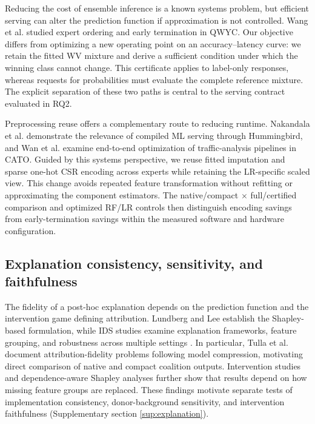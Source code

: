\documentclass[final,3p,10pt,nopreprintline]{elsarticle}
\begin{document}
Reducing the cost of ensemble inference is a known systems problem, but efficient serving can alter the prediction function if approximation is not controlled. Wang et al. \cite{r6} studied expert ordering and early termination in QWYC. Our objective differs from optimizing a new operating point on an accuracy--latency curve: we retain the fitted WV mixture and derive a sufficient condition under which the winning class cannot change. This certificate applies to label-only responses, whereas requests for probabilities must evaluate the complete reference mixture. The explicit separation of these two paths is central to the serving contract evaluated in RQ2.

Preprocessing reuse offers a complementary route to reducing runtime. Nakandala et al. \cite{r7} demonstrate the relevance of compiled ML serving through Hummingbird, and Wan et al. \cite{r8} examine end-to-end optimization of traffic-analysis pipelines in CATO. Guided by this systems perspective, we reuse fitted imputation and sparse one-hot CSR encoding across experts while retaining the LR-specific scaled view. This change avoids repeated feature transformation without refitting or approximating the component estimators. The native/compact \(\times\) full/certified comparison and optimized RF/LR controls then distinguish encoding savings from early-termination savings within the measured software and hardware configuration.

\subsection{Explanation consistency, sensitivity, and faithfulness}

The fidelity of a post-hoc explanation depends on the prediction function and the intervention game defining attribution. Lundberg and Lee \cite{r9} establish the Shapley-based formulation, while IDS studies examine explanation frameworks, feature grouping, and robustness across multiple settings \cite{r10,r11,r12,r21,r22,r23,r24}. In particular, Tulla et al. \cite{r25} document attribution-fidelity problems following model compression, motivating direct comparison of native and compact coalition outputs. Intervention studies \cite{r13} and dependence-aware Shapley analyses \cite{r14,r15} further show that results depend on how missing feature groups are replaced. These findings motivate separate tests of implementation consistency, donor-background sensitivity, and intervention faithfulness (Supplementary section \ref*{sup:explanation}).
\end{document}

